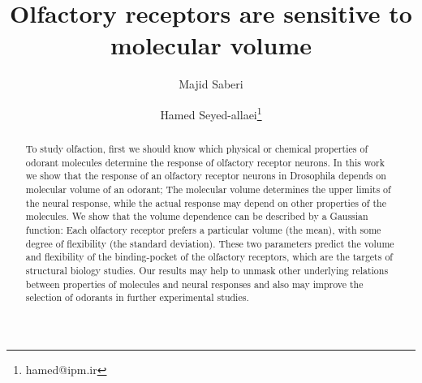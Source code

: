 \documentclass[11pt]{paper} %
\title{Olfactory receptors are sensitive to molecular volume}
\author{Majid Saberi \and Hamed Seyed-allaei\thanks{hamed@ipm.ir}}
\begin{document}
\maketitle

\begin{abstract}
        To study olfaction, 
         first we should know which physical or chemical properties of odorant molecules determine 
	the response of olfactory receptor neurons.
	In this work we show that the response of an olfactory receptor neurons in Drosophila depends on molecular volume of an odorant;  
	The molecular volume determines the upper limits of the neural response, 
	while the actual response may depend on other properties of the molecules.
	We show that the volume dependence can be described by a Gaussian function: 
	Each olfactory receptor prefers a particular volume (the mean), 
	with some degree of flexibility (the standard deviation). 
	These two parameters predict the volume and flexibility of the binding-pocket of the olfactory receptors, 
	which are the targets of structural biology studies. 
	Our results may help to unmask other underlying relations between properties of molecules and neural responses 
	and also may improve the selection of odorants in further experimental studies.
	

\end{abstract}
\end{document}
